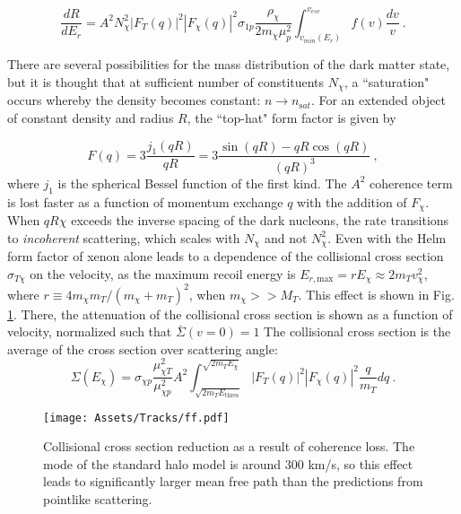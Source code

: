   \begin{equation}
     \frac{dR}{dE_r} = A^2 N_\chi^2 |F_T(q)|^2|F_{\chi}(q)|^2 \sigma_{1 p} \frac{\rho_\chi}{2m_\chi \mu_p^2} \int_{v_{min}(E_r)}^{v_{esc}} f(v) \frac{dv}{v}~.
     \label{eq:mimpscattering}
 \end{equation}

There are several possibilities for the mass distribution of the dark matter state, but it is thought that at sufficient number of constituents $N_\chi$, a ``saturation" occurs whereby the density becomes constant:  $n\rightarrow n_{\mathrm sat}$\cite{gresham_nuclear_2017}. 
For an extended object of constant density and radius $R$, the ``top-hat" form factor is given by 
 
 \begin{equation}
     F(q) = 3\frac{j_1(qR)}{qR} = 3 \frac{\sin(qR) - qR\cos(qR)}{(qR)^3}~,
     \label{eq:tophat}
 \end{equation}
 \noindent
 where $j_1$ is the spherical Bessel function of the first kind.
The $A^2$ coherence term is lost faster as a function of momentum exchange $q$ with the addition of $F_\chi$.
When $qR\chi $ exceeds the inverse spacing of the dark nucleons, the rate transitions to \textit{incoherent} scattering, which scales with $N_\chi$ and not $N_\chi^2$\cite{coskuner_direct_2019}.
 Even with the Helm\cite{helm_inelastic_1956} form factor of xenon alone leads to a dependence of the collisional cross section $\sigma_{T\chi}$ on the velocity, as the maximum recoil energy is $E_{r, \mathrm {max}} = rE_\chi \approx 2 m_T v_\chi^2$, where $r \equiv 4 m_\chi m_T / (m_\chi + m_T)^2$, when $m_\chi >> M_T$.
 This effect is shown in Fig. \ref{fig:coherence}.
 There, the attenuation of the collisional cross section is shown as a function of velocity, normalized such that $\bar \Sigma(v=0) =1$
 The collisional cross section is the average of the cross section over scattering angle:
 \begin{equation}
     \Sigma (E_\chi) =  \sigma_{\chi p } \frac{\mu_{\chi T}^2}{\mu_{\chi p}^2} A^2 \int_{\sqrt{2 m_T E_{\mathrm{thres}} }}^{\sqrt{ 2 m_T E_\chi}} |F_T (q) |^2 |F_\chi (q)|^2 \frac{q}{m_T}dq~.
     \label{eq:collisional}
 \end{equation}
 
 \begin{figure}
     \centering
     \texttt{[image: Assets/Tracks/ff.pdf]}
     \caption[WIMP-nucleon collisional cross section reduction as a result of coherence loss. ]%
     {Collisional cross section reduction as a result of coherence loss. The mode of the standard halo model is around 300 km/s, so this effect leads to significantly larger mean free path  than the predictions from pointlike scattering.}
     \label{fig:coherence}
 \end{figure}
 
